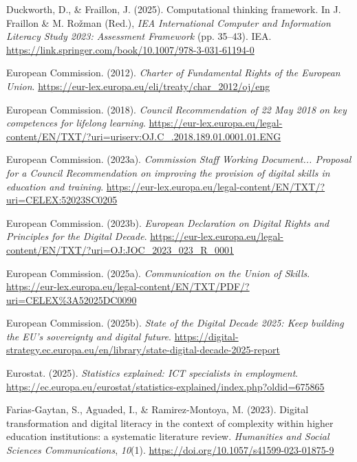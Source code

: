 \documentclass[
  dutch,
  letterpaper,
  DIV=11,
  numbers=noendperiod]{scrartcl}
\newlength{\cslhangindent}
\newenvironment{CSLReferences}[2] %
 {\begin{list}{}{%
  \setlength{\itemindent}{0pt}
  \setlength{\leftmargin}{0pt}
  \setlength{\parsep}{0pt}
  \ifodd #1
   \setlength{\leftmargin}{\cslhangindent}
   \setlength{\itemindent}{-1\cslhangindent}
  \fi
  \setlength{\itemsep}{#2\baselineskip}}}
 {\end{list}}
\begin{document}
\begin{CSLReferences}{1}{0}
Duckworth, D., \& Fraillon, J. (2025). Computational thinking framework.
In J. Fraillon \& M. Rožman (Red.), \emph{IEA International Computer and
Information Literacy Study 2023: Assessment Framework} (pp. 35--43).
IEA. \url{https://link.springer.com/book/10.1007/978-3-031-61194-0}

European Commission. (2012). \emph{Charter of Fundamental Rights of the
European Union}.
\url{https://eur-lex.europa.eu/eli/treaty/char_2012/oj/eng}

European Commission. (2018). \emph{Council Recommendation of 22 May 2018
on key competences for lifelong learning}.
\url{https://eur-lex.europa.eu/legal-content/EN/TXT/?uri=uriserv:OJ.C_.2018.189.01.0001.01.ENG}

European Commission. (2023a). \emph{Commission Staff Working Document...
Proposal for a Council Recommendation on improving the provision of
digital skills in education and training}.
\url{https://eur-lex.europa.eu/legal-content/EN/TXT/?uri=CELEX:52023SC0205}

European Commission. (2023b). \emph{European Declaration on Digital
Rights and Principles for the Digital Decade}.
\url{https://eur-lex.europa.eu/legal-content/EN/TXT/?uri=OJ:JOC_2023_023_R_0001}

European Commission. (2025a). \emph{Communication on the Union of
Skills}.
\url{https://eur-lex.europa.eu/legal-content/EN/TXT/PDF/?uri=CELEX\%3A52025DC0090}

European Commission. (2025b). \emph{State of the Digital Decade 2025:
Keep building the {EU's} sovereignty and digital future}.
\url{https://digital-strategy.ec.europa.eu/en/library/state-digital-decade-2025-report}

Eurostat. (2025). \emph{Statistics explained: {ICT} specialists in
employment}.
\url{https://ec.europa.eu/eurostat/statistics-explained/index.php?oldid=675865}

Farias-Gaytan, S., Aguaded, I., \& Ramirez-Montoya, M. (2023). Digital
transformation and digital literacy in the context of complexity within
higher education institutions: a systematic literature review.
\emph{Humanities and Social Sciences Communications}, \emph{10}(1).
\url{https://doi.org/10.1057/s41599-023-01875-9}


\end{CSLReferences}
\end{document}
